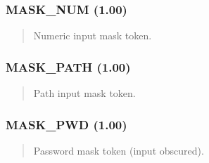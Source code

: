 \documentclass[letterpaper,10pt,english]{sphinxmanual}
\begin{document}
\subsubsection{MASK\_NUM (1.00)}
\label{\detokenize{ppl:mask-num-1-00}}\begin{quote}

\sphinxAtStartPar
{}
\begin{description}
\sphinxAtStartPar
Numeric input mask token.

\end{description}
\end{quote}


\subsubsection{MASK\_PATH (1.00)}
\label{\detokenize{ppl:mask-path-1-00}}\begin{quote}

\sphinxAtStartPar
{}
\begin{description}
\sphinxAtStartPar
Path input mask token.

\end{description}
\end{quote}


\subsubsection{MASK\_PWD (1.00)}
\label{\detokenize{ppl:mask-pwd-1-00}}\begin{quote}

\sphinxAtStartPar
{}
\begin{description}
\sphinxAtStartPar
Password mask token (input obscured).

\end{description}
\end{quote}
\end{document}
